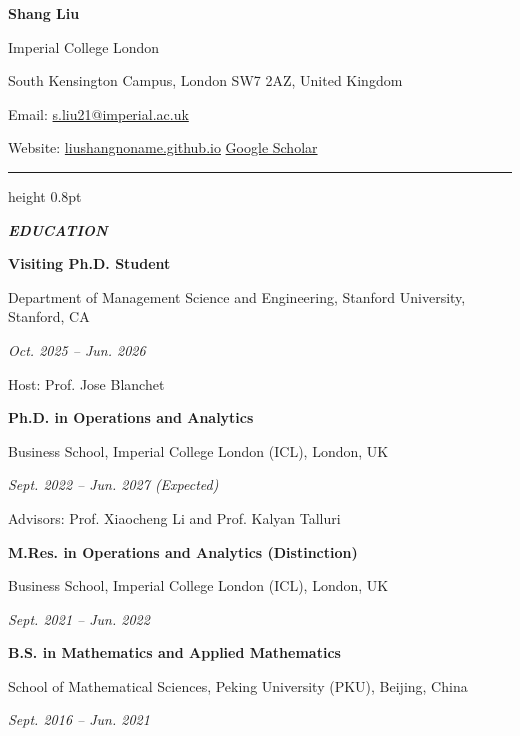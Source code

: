 \documentclass[11pt,letterpaper]{article}
\newcommand{\cvsection}[1]{%
  \vspace{8pt}%
  {\color{ruleblue}\hrule height 0.8pt}%
  \vspace{2pt}%
  {\fontsize{15}{17}\selectfont\bfseries\itshape #1}\par
  \vspace{3pt}%
}
\newenvironment{educationlist}{%
  \begin{list}{}{%
    \setlength{\leftmargin}{0.38in}%
    \setlength{\rightmargin}{0.12in}%
    \setlength{\itemsep}{8pt}%
    \setlength{\topsep}{0pt}%
    \setlength{\parsep}{0pt}%
    \setlength{\partopsep}{0pt}%
  }%
}{\end{list}}
\begin{document}
\begin{center}
  {\fontsize{22}{25}\selectfont\bfseries Shang Liu}\par
  \vspace{10pt}
  {\fontsize{13}{16}\selectfont Imperial College London}\par
  {\fontsize{13}{16}\selectfont South Kensington Campus, London SW7 2AZ, United Kingdom}\par
  \vspace{3pt}
  {\fontsize{13}{16}\selectfont Email: \href{mailto:s.liu21@imperial.ac.uk}{s.liu21@imperial.ac.uk}}\par
  \vspace{2pt}
  {\fontsize{11}{14}\selectfont
    Website: \href{https://liushangnoname.github.io/}{liushangnoname.github.io}
    \quad\textbar\quad
    \href{https://scholar.google.co.uk/citations?user=gnnxAZoAAAAJ}{Google Scholar}}\par
\end{center}

\vspace{-2pt}
\cvsection{EDUCATION}

\begin{educationlist}
  \item[]
  \textbf{Visiting Ph.D. Student}\par
  Department of Management Science and Engineering, Stanford University, Stanford, CA\par
  \textit{Oct. 2025 -- Jun. 2026}\par
  Host: Prof. Jose Blanchet

  \item[]
  \textbf{Ph.D. in Operations and Analytics}\par
  Business School, Imperial College London (ICL), London, UK\par
  \textit{Sept. 2022 -- Jun. 2027 (Expected)}\par
  Advisors: Prof. Xiaocheng Li and Prof. Kalyan Talluri

  \item[]
  \textbf{M.Res. in Operations and Analytics (Distinction)}\par
  Business School, Imperial College London (ICL), London, UK\par
  \textit{Sept. 2021 -- Jun. 2022}

  \item[]
  \textbf{B.S. in Mathematics and Applied Mathematics}\par
  School of Mathematical Sciences, Peking University (PKU), Beijing, China\par
  \textit{Sept. 2016 -- Jun. 2021}
\end{educationlist}
\end{document}
